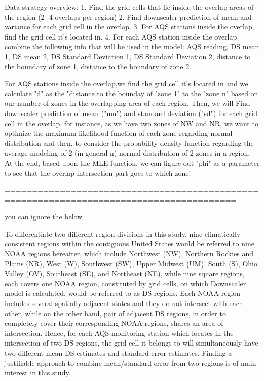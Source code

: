 Data strategy overview:
1.    Find the grid cells that lie inside the overlap areas of the region (2- 4 overlaps per region)
2.    Find downscaler prediction of mean and variance for each grid cell in the overlap.
3.    For AQS stations inside the overlap, find the grid cell it’s located in.
4.    For each AQS station inside the overlap combine the following info that will be used in the model: AQS reading, DS mean 1, DS mean 2, DS Standard Deviation 1, DS Standard Deviation 2, distance to the boundary of zone 1, distance to the boundary of zone 2.





For AQS stations inside the overlap,we find the grid cell it’s located in and we calculate "d" as the "distance to the bounday of "zone 1" to the "zone n" based on our number of zones in the overlapping area of each region. Then, we will Find downscaler prediction of mean ("mu") and standard deviation ("sd") for each grid cell in the overlap.
for instance, as we have two zones of NW and NR, we want to optimize the maximum likelihood function of each zone regarding normal distribution and then, to consider the probability density function regarding the average modeling of 2 (in general n) normal distribution of 2 zones in a region.
At the end, based upon the MLE function, we can figure out "phi" as a parameter to see that the overlap intersection part goes to which zone!


========================================================================================







you can ignore the below














To differentiate two different region divisions in this study, nine climatically consistent regions within the contiguous United States would be referred to nine NOAA regions hereafter, which include Northwest (NW), Northern Rockies and Plains (NR), West (W), Southwest (SW), Upper Midwest (UM), South (S), Ohio Valley (OV), Southeast (SE), and Northeast (NE), while nine square regions, each covers one NOAA region, constituted by grid cells, on which Downscaler model is calculated, would be referred to as DS regions. Each NOAA region includes several spatially adjacent states and they do not intersect with each other, while on the other hand, pair of adjacent DS regions, in order to completely cover their corresponding NOAA regions, shares an area of intersection. Hence, for each AQS monitoring station which locates in the intersection of two DS regions, the grid cell it belongs to will simultaneously have two different mean DS estimates and standard error estimates. Finding a justifiable approach to combine mean/standard error from two regions is of main interest in this study.


